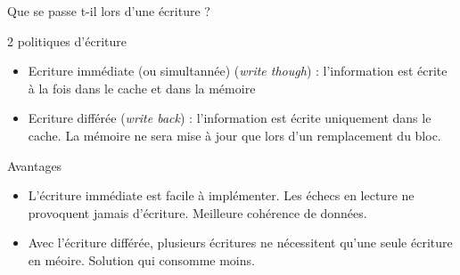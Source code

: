 %
\begin{Frame}{Que se passe t-il lors d'une écriture ?}


      \begin{block}{2 politiques d'écriture}
       \begin{center}
 	\begin{itemize}
         \item Ecriture immédiate (ou simultannée) (\emph{write though}) : l'information est écrite à la fois dans le cache et dans la mémoire 
         \item Ecriture différée (\emph{write back}) : l'information est écrite uniquement dans le cache. La mémoire ne sera mise à jour que lors d'un remplacement du bloc. 
        \end{itemize}
       \end{center}
      \end{block}   

  


  

  \begin{block}{Avantages}
    \begin{center}
 	\begin{itemize}
        \item L'écriture immédiate est facile à implémenter. Les échecs en lecture ne provoquent jamais d'écriture. Meilleure cohérence de données.
        \item Avec l'écriture différée, plusieurs écritures ne nécessitent qu'une seule écriture en méoire. Solution qui consomme moins.
        \end{itemize}
    \end{center}
  \end{block}   

 

\end{Frame}


